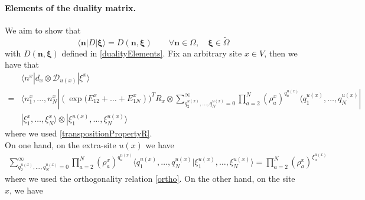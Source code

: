 \documentclass[11pt]{article}
\numberwithin{equation}{section}
\numberwithin{equation}{subsection}
\newcommand{\dd}{\mathcal{D}_{u(x)}}
\begin{document}
\paragraph{Elements of the duality matrix.}We aim to show that 
\begin{equation}\label{proofDualityElements}
\langle \bm{n}|D|\bm{\xi}\rangle=D(\bm{n},\bm{\xi})\qquad   \forall \bm{n}\in \Omega,\quad \bm{\xi}\in \widetilde{\Omega}
\end{equation}
with $D(\bm{n},\bm{\xi})$ defined in \eqref{dualityElements}. 
Fix an arbitrary site $x\in V$, then we have that 
\begin{align*}
	 &\langle n^{x}|d_{x}\otimes \dd|\xi^{x}\rangle\\=&\langle n_{1}^{x},\ldots,n_{N}^{x}| (\exp{(E_{12}^{x}+\ldots+E_{1N}^{x}}))^{T}R_{x}\otimes\sum_{q_{2}^{u(x)},\ldots,q_{N}^{u(x)}=0}^{\infty}\prod_{a=2}^{N}\left(\rho_{a}^{x}\right)^{q_{a}^{u(x)}}\langle q_{1}^{u(x)},\ldots,q_{N}^{u(x)}|
	 \\&|\xi_{1}^{x},\ldots,\xi_{N}^{x}\rangle \otimes |\xi_{1}^{u(x)},\ldots,\xi_{N}^{u(x)}\rangle
\end{align*}
where we used \eqref{transpositionPropertyR}. \\
On one hand, on the extra-site $u(x)$ we have 
\begin{align*}
\sum_{q_{2}^{u(x)},\ldots,q_{N}^{u(x)}=0}^{\infty}\prod_{a=2}^{N}\left(\rho_{a}^{x}\right)^{q_{a}^{u(x)}}\langle q_{1}^{u(x)},\ldots,q_{N}^{u(x)}|\xi_{1}^{u(x)},\ldots,\xi_{N}^{u(x)}\rangle=\prod_{a=2}^{N}\left(\rho_{a}^{x}\right)^{\xi_{a}^{u(x)}}
\end{align*}
where we used the orthogonality relation \eqref{ortho}. 
On the other hand, on the site $x$, we have 
\end{document}
